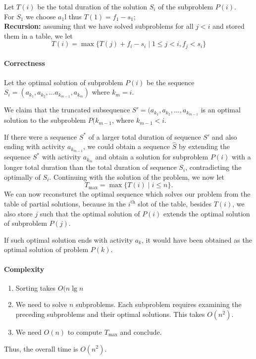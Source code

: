Let \(T(i)\) be the total duration of the solution \(S_i\) of the subproblem \(P(i)\). \\
For \(S_1\) we choose \(a_1\)l thus \(T(1) = f_1 - s_1\); \\
\textbf{Recursion:} assuming that we have solved subproblems for all \(j < i\) and stored them in a table, we let 
\[T(i) = \max \{T(j) + f_i - s_i \mid 1 \leq j < i, f_j < s_i\}\]

\paragraph{Correctness}
Let the optimal solution of subproblem \(P(i)\) be the sequence \(S_i = (a_{k_1}, a_{k_2}, \dots a_{k_{m-1}}, a_{k_m})\) where \(k_m = i\). 

We claim that the truncated subsequence \(S' = (a_{k_1}, a_{k_2}, \dots, a_{k_{m-1}}\) is an optimal solution to the subproblem \(P(k_{m-1}\), where \(k_{m-1} < i\). 

If there were a sequence \(S^*\) of a larger total duration of sequence \(S'\) and also ending with activity \(a_{k_{m-1}}\), we could obtain a sequence \(\hat{S}\) by extending the sequence \(S^*\) with activity \(a_{k_m}\) and obtain a solution for subproblem \(P(i)\) with a longer total duration than the total duration of sequence \(S_i\), contradicting the optimally of \(S_i\). Continuing with the solution of the problem, we now let 
\[T_{\max} = \max \{T(i) \mid i \leq n\}.\]
We can now reconsturct the optimal sequence which solves our problem from the table of partial solutions, because in the \(i^{\text{th}}\) slot of the table, besides \(T(i)\), we also store \(j\) such that the optimal solution of \(P(i)\) extends the optimal solution of subproblem \(P(j)\).

If such optimal solution ends with activity \(a_k\), it would have been obtained as the optimal solution of problem \(P(k)\).

\paragraph{Complexity}
\begin{enumerate}
    \item Sorting takes \(O(n \lg n\)
    \item We need to solve \(n\) subproblems. Each subproblem requires examining the preceding subproblems and their optimal solutions. This takes \(O(n^2)\).
    \item We need \(O(n)\) to compute \(T_{\max}\) and conclude.
\end{enumerate}
Thus, the overall time is \(O(n^2)\).

